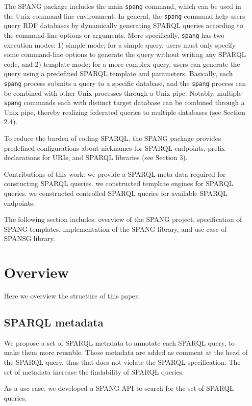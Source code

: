 \documentclass[runningheads]{llncs}
\begin{document}
The SPANG package includes the main {\tt spang} command, which can be used in the Unix command-line environment.
In general, the {\tt spang} command help users query RDF databases by dynamically generating SPARQL queries according to the command-line options or arguments. 
More specifically, {\tt spang} has two execution modes: 
1) simple mode; for a simple query, users must only specify some command-line options to generate the query without writing any SPARQL code, and
2) template mode; for a more complex query, users can generate the query using a predefined SPARQL template and parameters.
Basically, each {\tt spang} process submits a query to a specific database,
and the {\tt spang} process can be combined with other Unix processes through a Unix pipe. 
Notably, multiple {\tt spang} commands each with distinct target database can be combined through a Unix pipe, thereby realizing federated queries to multiple databases (see Section 2.4). 

To reduce the burden of coding SPARQL, the SPANG package provides predefined configurations about nicknames for SPARQL endpoints, prefix declarations for URIs, and SPARQL libraries (see Section 3).


Contributions of this work:
we provide a SPARQL meta data required for constucting SPARQL queries.
we constructed template engines for SPARQL queries.
we constructed controlled SPARQL queries for available SPARQL endpoints.


The following section includes: overview of the SPANG project, specification of SPANG templates, implementation of the SPANG library, and use case of SPANSG library.


\section{Overview}
Here we overview the structure of this paper.

\subsection{SPARQL metadata}

We propose a set of SPARQL metadata to annotate each SPARQL query, to make them more reusable.
Those metadata are added as comment at the head of the SPARQL query, thus that does not violate the SPARQL specification. 
The set of metadata increase the findability of SPARQL queries.

As a use case, we developed a SPANG API to search for the set of SPARQL queries.
\end{document}

